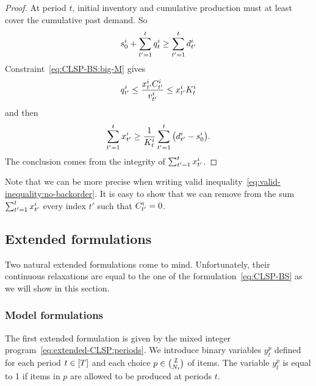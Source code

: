 \begin{proof}
At period $t$, initial inventory and cumulative production must at least cover the cumulative past demand.
So
\begin{equation}
  s_0^i + \sum_{t'=1}^{t} q_t^i \ge \sum_{t'=1}^{t}d_{t'}^i
\end{equation}
Constraint~\eqref{eq:CLSP-BS:big-M} gives
\begin{equation}
  q_{t'}^i \le \frac{x_{t'}^iC_{t'}^i}{v_{t'}^i} \le x_{t'}^i K_t^i
\end{equation}
and then
\begin{equation}
  \sum_{t'=1}^t\setup_{t'}^i \ge \frac{1}{K_t^i}\sum_{t'=1}^t\bracket{\demand_{t'}^i-\inventory_0^i}.
\end{equation}
The conclusion comes from the integrity of $\sum_{t'=1}^tx_{t'}^i$.
\end{proof}


Note that we can be more precise when writing valid inequality~\eqref{eq:valid-inequality:no-backorder}.
It is easy to show that we can remove from the sum $\sum_{t'=1}^{t}x_{t'}^i$ every index $t'$ such that $C_{t'}^i=0$.




\subsection{Extended formulations}
\label{sec:PDP:deterministic:theoretical-results:extended-formulations}


Two natural extended formulations come to mind.
Unfortunately, their continuous relaxations are equal to the one of the formulation~\eqref{eq:CLSP-BS} as we will show in this section.


\subsubsection{Model formulations}


The first extended formulation is given by the mixed integer program~\eqref{eq:extended-CLSP:periods}.
We introduce binary variables $y_t^p$ defined for each period $t\in\range{\horizon}$ and each choice $p\in{\mathcal{I}\choose N_t}$ of items.
The variable $y_t^p$ is equal to 1 if items in $p$ are allowed to be produced at periods $t$.


